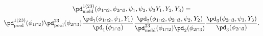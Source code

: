 \begin{multline}
  \pd_{\text{meld}}^{1(23)}(\phi_{1 \cap 2}, \phi_{2 \cap 3}, \psi_{1}, \psi_{2}, \psi_{3} Y_{1}, Y_{2}, Y_{3}) = \\
    \pd_{\text{pool}}^{1(23)}(\phi_{1 \cap 2}) 
    \pd_{\text{pool}}^{23}(\phi_{2 \cap 3})
    \frac{
      \pd_{1}(\phi_{1 \cap 2}, \psi_{1}, Y_{1})
    } {
      \pd_{1}(\phi_{1 \cap 2})
    }
    \frac {
      \pd_{2}(\phi_{1 \cap 2}, \phi_{2 \cap 3}, \psi_{2}, Y_{2})
    } {
      \pd_{\text{meld}}^{23}(\phi_{1 \cap 2})
      \pd_{2}(\phi_{2 \cap 3})
    }
    \frac{
      \pd_{3}(\phi_{2 \cap 3}, \psi_{3}, Y_{3})
    } {
      \pd_{3}(\phi_{2 \cap 3})
    }.
  \label{eqn:symmetric-expanded-double-melded-model}
\end{multline}